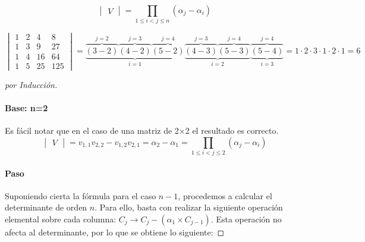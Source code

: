 \[\begin{vmatrix} V \end{vmatrix}=\prod_{1 \le i<j\le n}(\alpha_j-\alpha_i)\]

\begin{example}
\[
\begin{vmatrix}
1&2&4&8\\
1&3&9&27\\
1&4&16&64\\
1&5&25&125
\end{vmatrix} = \underbrace{\overbrace{(3-2)}^{j=2}\overbrace{(4-2)}^{j=3}\overbrace{(5-2)}^{j=4}}_{i=1}\underbrace{\overbrace{(4-3)}^{j=3}\overbrace{(5-3)}^{j=4}}_{i=2}\underbrace{\overbrace{(5-4)}^{j=4}}_{i=3} = 1·2·3·1·2·1 = 6
\]
\end{example}

\begin{proof}[por Inducción]

\paragraph{Base: n=2} Es fácil notar que en el caso de una matriz de 2×2 el resultado es correcto.
\[\begin{vmatrix} V \end{vmatrix}=v_{1,1}v_{2,2} - v_{1,2}v_{2,1}=\alpha_2-\alpha_1=\prod_{1\le i<j\le 2} (\alpha_j-\alpha_i)\]

\paragraph{Paso}
Suponiendo cierta la fórmula para el caso $n-1$, procedemos a calcular el determinante de orden $n$. Para ello, basta con realizar la siguiente operación elemental sobre cada columna: $C_{j}\rightarrow C_{j}-(\alpha_1 \times C_{j-1})$. Esta operación no afecta al determinante, por lo que se obtiene lo siguiente:


\end{proof}
